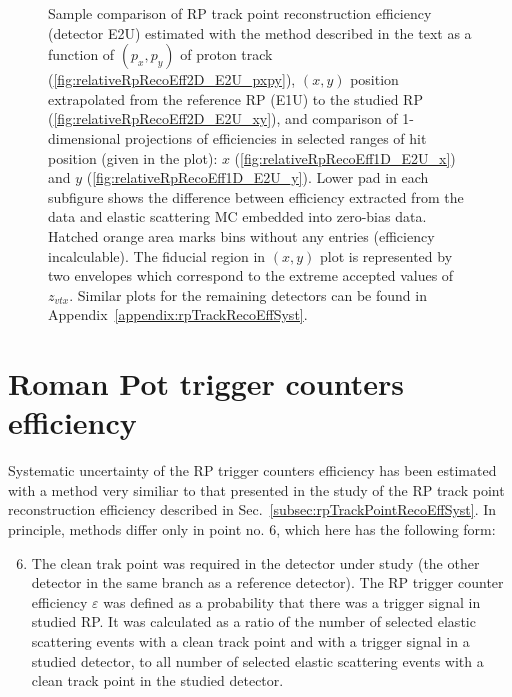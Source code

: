 \begin{figure}[h]
{\begin{subfigure}[b]{\linewidth}
		\end{subfigure}
	}
	\caption[Coparison of estimated RP track point reconstruction efficiency in 2D and 1D (detector E2U).]%
	{Sample comparison of RP track point reconstruction efficiency (detector E2U) estimated with the method described in the text as a function of $(p_{x},p_{y})$ of proton track (\ref{fig:relativeRpRecoEff2D_E2U_pxpy}), $(x,y)$ position extrapolated from the reference RP (E1U) to the studied RP (\ref{fig:relativeRpRecoEff2D_E2U_xy}), and comparison of 1-dimensional projections of efficiencies in selected ranges of hit position (given in the plot): $x$ (\ref{fig:relativeRpRecoEff1D_E2U_x}) and $y$ (\ref{fig:relativeRpRecoEff1D_E2U_y}). Lower pad in each subfigure shows the difference between efficiency extracted from the data and elastic scattering MC embedded into zero-bias data. Hatched orange area marks bins without any entries (efficiency incalculable). The fiducial region in $(x,y)$ plot is represented by two envelopes which correspond to the extreme accepted values of $z_{vtx}$. Similar plots for the remaining detectors can be found in Appendix~\ref{appendix:rpTrackRecoEffSyst}.%
	}\label{fig:relativeRpRecoEff_E2U}
\end{figure}




\section{Roman Pot trigger counters efficiency}\label{sec:rpTriggerEffSystematics}

Systematic uncertainty of the RP trigger counters efficiency has been estimated with a method very similiar to that presented in the study of the RP track point reconstruction efficiency described in Sec.~\ref{subsec:rpTrackPointRecoEffSyst}. In principle, methods differ only in point no. 6, which here has the following form:

\begin{enumerate}\setcounter{enumi}{5}%
\item The clean trak point was required in the detector under study (the other detector in the same branch as a reference detector). The RP trigger counter efficiency $\varepsilon$ was defined as a probability that there was a trigger signal in studied RP. It was calculated as a ratio of the number of selected elastic scattering events with a clean track point and with a trigger signal in a studied detector, to all number of selected elastic scattering events with a clean track point in the studied detector.
\end{enumerate}

